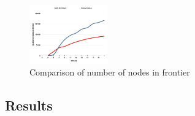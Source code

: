 \documentclass[Main]{subfiles}
\begin{document}
\begin{figure}[h!]
    \centering
    \includegraphics[width=0.3\textwidth]{nodes_in_frontier_compare.png}
    \caption{Comparison of number of nodes in frontier}
    \label{fig:node_frontier_comparison}
\end{figure}















\subsection{Results}




\FloatBarrier
\end{document}
